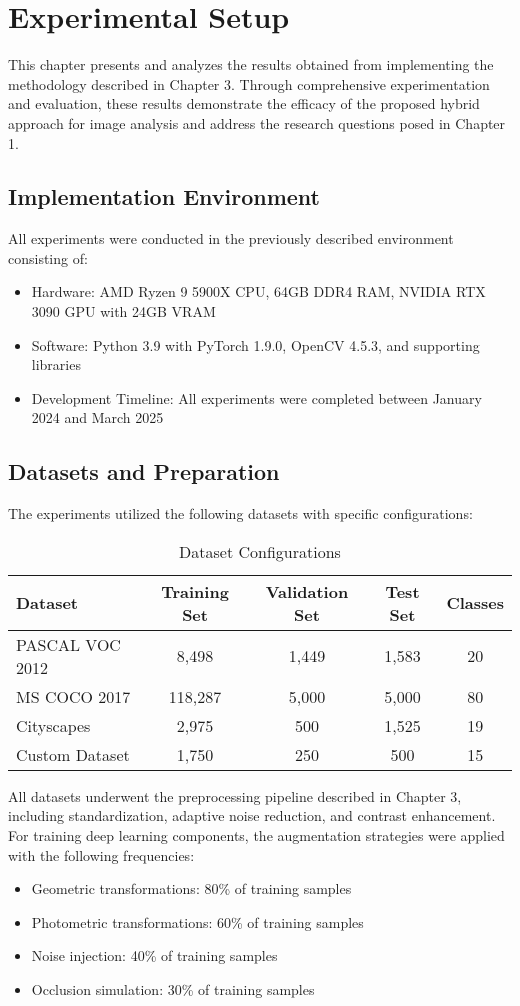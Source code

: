 \section{Experimental Setup}

This chapter presents and analyzes the results obtained from implementing the methodology described in Chapter 3. Through comprehensive experimentation and evaluation, these results demonstrate the efficacy of the proposed hybrid approach for image analysis and address the research questions posed in Chapter 1.

\subsection{Implementation Environment}
All experiments were conducted in the previously described environment consisting of:
\begin{itemize}
    \item Hardware: AMD Ryzen 9 5900X CPU, 64GB DDR4 RAM, NVIDIA RTX 3090 GPU with 24GB VRAM
    \item Software: Python 3.9 with PyTorch 1.9.0, OpenCV 4.5.3, and supporting libraries
    \item Development Timeline: All experiments were completed between January 2024 and March 2025
\end{itemize}

\subsection{Datasets and Preparation}
The experiments utilized the following datasets with specific configurations:

\begin{table}[h]
\centering
\caption{Dataset Configurations}
\label{tab:dataset_configs}
\begin{tabular}{lcccc}
\hline
\textbf{Dataset} & \textbf{Training Set} & \textbf{Validation Set} & \textbf{Test Set} & \textbf{Classes} \\
\hline
PASCAL VOC 2012 & 8,498 & 1,449 & 1,583 & 20 \\
MS COCO 2017 & 118,287 & 5,000 & 5,000 & 80 \\
Cityscapes & 2,975 & 500 & 1,525 & 19 \\
Custom Dataset & 1,750 & 250 & 500 & 15 \\
\hline
\end{tabular}
\end{table}

All datasets underwent the preprocessing pipeline described in Chapter 3, including standardization, adaptive noise reduction, and contrast enhancement. For training deep learning components, the augmentation strategies were applied with the following frequencies:
\begin{itemize}
    \item Geometric transformations: 80\% of training samples
    \item Photometric transformations: 60\% of training samples
    \item Noise injection: 40\% of training samples
    \item Occlusion simulation: 30\% of training samples
\end{itemize}

